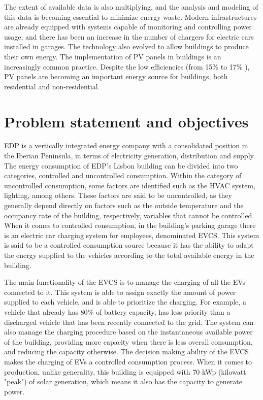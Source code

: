 The extent of available data is also multiplying, and the analysis and modeling of this data is becoming essential to minimize energy waste. Modern infrastructures are already equipped with systems capable of monitoring and controlling power usage, and there has been an increase in the number of chargers for electric cars installed in garages. The technology also evolved to allow buildings to produce their own energy. The implementation of \ac{PV} panels in buildings is an increasingly common practice. Despite the low efficiencies (from 15\% to 17\% \cite{pv}), \ac{PV} panels are becoming an important energy source for buildings, both  residential and non-residential. 









\section{Problem statement and objectives}


\ac{EDP} is a vertically integrated energy company with a consolidated position in the Iberian Peninsula, in terms of electricity generation, distribution and supply. The energy consumption of \ac{EDP}'s Lisbon building can be divided into two categories, controlled and uncontrolled consumption. Within the category of uncontrolled consumption, some factors are identified such as the \ac{HVAC} system, lighting, among others. These factors are said to be uncontrolled, as they generally depend directly on factors such as the outside temperature and the occupancy rate of the building, respectively, variables that cannot be controlled. When it comes to controlled consumption, in the building's parking garage there is an electric car charging system for employees, denominated \ac{EVCS}. This system is said to be a controlled consumption source because it has the ability to adapt the energy supplied to the vehicles according to the total available energy in the building. 

The main functionality of the \ac{EVCS} is to manage the charging of all the \ac{EV}s connected to it. This system is able to assign exactly the amount of power supplied to each vehicle, and is able to prioritize the charging. For example, a vehicle that already has 80$\%$ of battery capacity, has less priority than a discharged vehicle that has been recently connected to the grid. The system can also manage the charging procedure based on the instantaneous available power of the building, providing more capacity when there is less overall consumption, and reducing the capacity otherwise. The decision making ability of the \ac{EVCS} makes the charging of \ac{EV}s a controlled consumption process. When it comes to production, unlike generality, this building is equipped with 70 kWp (kilowatt "peak") of solar generation, which means it also has the capacity to generate power. 



